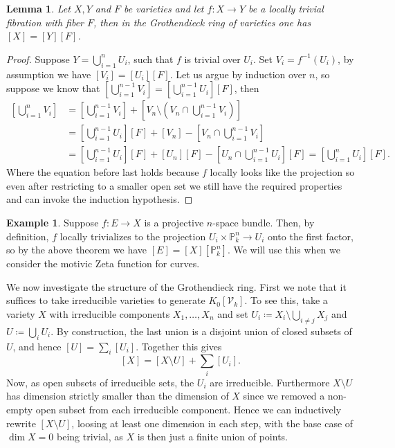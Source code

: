 \documentclass[11pt, a4paper, english, twoside]{article}
\theoremstyle{plain}
\newtheorem{lemma}[theorem]{Lemma}
\theoremstyle{definition}
\newtheorem{example}[theorem]{Example}
\newcommand{\gring}[1][k]{K_0[\mathcal{V}_#1]}
\begin{document}
\begin{lemma}
    \label{fibration}Let $X, Y$ and $F$ be varieties and
    let $f \colon X \to Y$ be a locally trivial fibration with fiber $F$, then in the Grothendieck ring of varieties
    one has $[X] = [Y][F]$.
\end{lemma}
\begin{proof}
    Suppose $Y = \bigcup_{i=1}^n U_i$, such that $f$ is trivial over $U_i$. Set $V_i = f^{-1}(U_i)$, by assumption we have $[V_i] = [U_i][F]$. 
    Let us argue by induction over $n$, so suppose we know that 
    $\left[ \bigcup_{i=1}^{n-1} V_i \right] = \left[\bigcup_{i=1}^{n-1} U_i \right][F]$, then
    \begin{align*}
        \left [ \bigcup_{i=1}^n V_i \right ]       
        &= \left [ \bigcup_{i=1}^{n-1} V_i \right ] + \left [ V_n \setminus (V_n \cap \bigcup_{i=1}^{n-1} V_i) \right ] \\
        & = \left [ \bigcup_{i=1}^{n-1} U_i \right ][F] + [V_n] - \left [ V_n \cap \bigcup_{i=1}^{n-1} V_i \right ] \\
        &= \left [ \bigcup_{i=1}^{n-1} U_i \right ][F] + [U_n][F] - \left [ U_n \cap \bigcup_{i=1}^{n-1} U_i\right ][F]
         = \left [ \bigcup_{i=1}^n U_i \right ][F].
    \end{align*}
    Where the equation before last holds because $f$ locally looks like the projection so even after restricting to a smaller open set we still
    have the required properties and can invoke the induction hypothesis.
\end{proof}

\begin{example}
    \label{projBundle}
    Suppose $f \colon E \to X$ is a projective $n$-space bundle. Then, by definition, $f$ locally trivializes to the projection
    $U_i \times \mathbb{P}_k^n \to U_i$ onto the first factor, so by the above theorem we have
    $[E] = [X][\mathbb{P}_k^n]$. We will use this when we consider the motivic Zeta function for curves.
\end{example}

We now investigate the structure of the Grothendieck ring. First we note that it suffices to take irreducible varieties to generate $\gring[k]$.
To see this, take a variety $X$ with irreducible components $X_1, \dots, X_n$ and set ${U_i \coloneqq X_i \setminus \bigcup_{i \neq j} X_j}$ and
$U \coloneqq \bigcup_i U_i$. By construction, the last union is a disjoint union of closed subsets of $U$, 
and hence $[U] = \sum_i [U_i]$. Together this gives
\[
    [X] = [X \setminus U] + \sum_i [U_i].
\] Now, as open subsets of irreducible sets, the $U_i$ are irreducible. Furthermore $X \setminus U$ has dimension
strictly smaller than the dimension of $X$ since we removed a non-empty open subset from each irreducible component. Hence we can inductively
rewrite $[X \setminus U]$, loosing at least one dimension in each step, with the base case of $\dim  X = 0$ being trivial, as $X$ is then
just a finite union of points.
\end{document}
